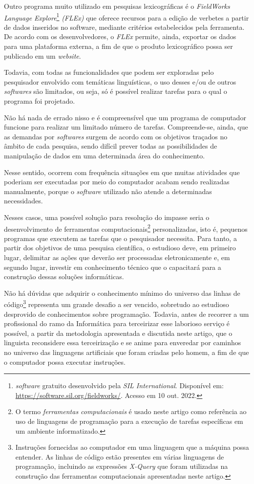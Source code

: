 \documentclass[portuguese]{textolivre}
\begin{document}
Outro programa muito utilizado em pesquisas lexicográficas é o \emph{FieldWorks Language Explore}\footnote{\emph{software} gratuito desenvolvido pela \emph{SIL International}. Disponível em: \url{https://software.sil.org/fieldworks/}. Acesso em 10 out. 2022.} \emph{(FLEx)} que oferece recursos para a edição de verbetes a partir de dados inseridos no software, mediante critérios estabelecidos pela ferramenta. De acordo com os desenvolvedores, o \emph{FLEx} permite, ainda, exportar os dados para uma plataforma externa, a fim de que o produto lexicográfico possa ser publicado em um \emph{website}.

Todavia, com todas as funcionalidades que podem ser exploradas pelo pesquisador envolvido com temáticas linguísticas, o uso desses e/ou de outros \emph{softwares} são limitados, ou seja, só é possível realizar tarefas para o qual o programa foi projetado. 

Não há nada de errado nisso e é compreensível que um programa de computador funcione para realizar um limitado número de tarefas. Compreende-se, ainda, que as demandas por \emph{softwares} surgem de acordo com os objetivos traçados no âmbito de cada pesquisa, sendo difícil prever todas as possibilidades de manipulação de dados em uma determinada área do conhecimento.

Nesse sentido, ocorrem com frequência situações em que muitas atividades que poderiam ser executadas por meio do computador acabam sendo realizadas manualmente, porque o \emph{software} utilizado não atende a determinadas necessidades. 

Nesses casos, uma possível solução para resolução do impasse seria o desenvolvimento de ferramentas computacionais\footnote{O termo \emph{ferramentas computacionais} é usado neste artigo como referência ao uso de linguagens de programação para a execução de tarefas específicas em um ambiente informatizado.} personalizadas, isto é, pequenos programas que executem as tarefas que o pesquisador necessita. Para tanto, a partir dos objetivos de uma pesquisa científica, o estudioso deve, em primeiro lugar, delimitar as ações que deverão ser processadas eletronicamente e, em segundo lugar, investir em conhecimento técnico que o capacitará para a construção dessas soluções informáticas.

Não há dúvidas que adquirir o conhecimento mínimo do universo das linhas de código\footnote{Instruções fornecidas ao computador em uma linguagem que a máquina possa entender. As linhas de código estão presentes em várias linguagens de programação, incluindo as expressões \emph{X-Query} que foram utilizadas na construção das ferramentas computacionais apresentadas neste artigo.} representa um grande desafio a ser vencido, sobretudo ao estudioso desprovido de conhecimentos sobre programação. Todavia, antes de recorrer a um profissional do ramo da Informática para terceirizar esse laborioso serviço é possível, a partir da metodologia apresentada e discutida neste artigo, que o linguista reconsidere essa terceirização e se anime para enveredar por caminhos no universo das linguagens artificiais que foram criadas pelo homem, a fim de que o computador possa executar instruções.
\end{document}
